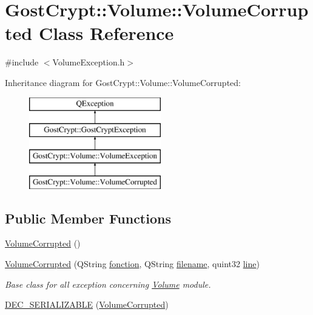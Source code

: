 \hypertarget{class_gost_crypt_1_1_volume_1_1_volume_corrupted}{}\section{Gost\+Crypt\+:\+:Volume\+:\+:Volume\+Corrupted Class Reference}
\label{class_gost_crypt_1_1_volume_1_1_volume_corrupted}


{\ttfamily \#include $<$Volume\+Exception.\+h$>$}

Inheritance diagram for Gost\+Crypt\+:\+:Volume\+:\+:Volume\+Corrupted\+:\begin{figure}[H]
\begin{center}
\leavevmode
\includegraphics[height=4.000000cm]{class_gost_crypt_1_1_volume_1_1_volume_corrupted}
\end{center}
\end{figure}
\subsection*{Public Member Functions}
\begin{DoxyCompactItemize}
\item 
\hyperlink{class_gost_crypt_1_1_volume_1_1_volume_corrupted_a491f7c494f691d43760c1cdfe25d81e1}{Volume\+Corrupted} ()
\item 
\hyperlink{class_gost_crypt_1_1_volume_1_1_volume_corrupted_a2f184d86b40b5da3f1c48939d677e52c}{Volume\+Corrupted} (Q\+String \hyperlink{class_gost_crypt_1_1_gost_crypt_exception_a29b8c93d5efbb1ff369107385725a939}{fonction}, Q\+String \hyperlink{class_gost_crypt_1_1_gost_crypt_exception_a749a12375f4ba9d502623b99d8252f38}{filename}, quint32 \hyperlink{class_gost_crypt_1_1_gost_crypt_exception_abf506d911f12a4e969eea500f90bd32c}{line})
\begin{DoxyCompactList}\small\item\em Base class for all exception concerning \hyperlink{class_gost_crypt_1_1_volume_1_1_volume}{Volume} module. \end{DoxyCompactList}\item 
\hyperlink{class_gost_crypt_1_1_volume_1_1_volume_corrupted_a8b858859c97bfbcf9575a30618dc3953}{D\+E\+C\+\_\+\+S\+E\+R\+I\+A\+L\+I\+Z\+A\+B\+LE} (\hyperlink{class_gost_crypt_1_1_volume_1_1_volume_corrupted}{Volume\+Corrupted})
\end{DoxyCompactItemize}
